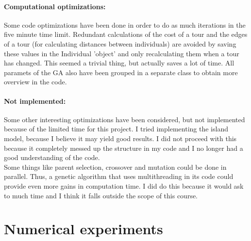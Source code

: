 \documentclass[a4paper,10pt]{article}
\newcommand{\ReplaceMe}[1]{{\color{blue}#1}}
\newcommand{\RemoveMe}[1]{{\color{purple}#1}}
\begin{document}
\paragraph{Computational optimizations:} Some code optimizations have been done in order to do as much iterations in the five minute time limit. Redundant calculations of the cost of a tour and the edges of a tour (for calculating distances between individuals) are avoided by saving these values in the Individual 'object' and only recalculating them when a tour has changed. This seemed a trivial thing, but actually saves a lot of time. All paramets of the GA also have been grouped in a separate class to obtain more overview in the code. 

\paragraph{Not implemented:} Some other interesting optimizations have been considered, but not implemented because of the limited time for this project. I tried implementing the island model, because I believe it may yield good results. I did not proceed with this because it completely messed up the structure in my code and I no longer had a good understanding of the code. \\

Some things like parent selection, crossover and mutation could be done in parallel. Thus, a genetic algorithm that uses multithreading in its code could provide even more gains in computation time. I did do this because it would ask to much time and I think it falls outside the scope of this course. 



\section{Numerical experiments}

\end{document}
